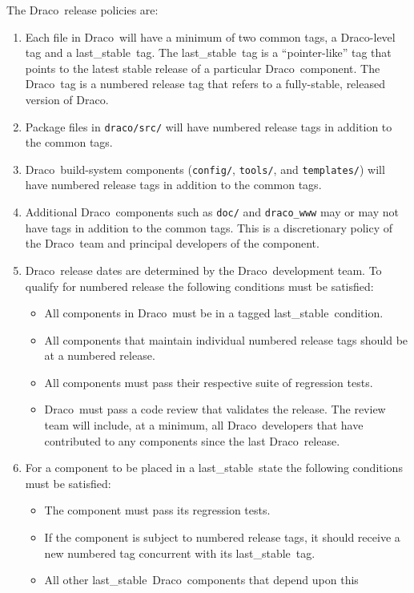 \documentclass[11pt]{nmemo}
\newcommand{\draco}{{\normalfont\normalsize\sffamily Draco}}
\newcommand{\stable}{{\normalfont\normalsize\ttfamily last\_stable}}
\begin{document}
The \draco\ release policies are:
\begin{enumerate}
\item Each file in \draco\ will have a minimum of two common tags, a
  \draco-level tag and a \stable\ tag.  The \stable\ tag is a
  ``pointer-like'' tag that points to the latest stable release of a
  particular \draco\ component.  The \draco\ tag is a numbered release
  tag that refers to a fully-stable, released version of \draco.
\item Package files in \texttt{draco/src/} will have numbered release
  tags in addition to the common tags.
\item \draco\ build-system components (\texttt{config/},
  \texttt{tools/}, and \texttt{templates/}) will have numbered release
  tags in addition to the common tags.
\item Additional \draco\ components such as \texttt{doc/} and
  \texttt{draco\_www} may or may not have tags in addition to the
  common tags.  This is a discretionary policy of the \draco\ team and 
  principal developers of the component.
\item \draco\ release dates are determined by the \draco\ development
  team.  To qualify for numbered release the following conditions must 
  be satisfied:
  \begin{itemize}
  \item All components in \draco\ must be in a tagged \stable\
    condition.
  \item All components that maintain individual numbered release tags
    should be at a numbered release.
  \item All components must pass their respective suite of
    regression tests.
  \item \draco\ must pass a code review that validates the release.
    The review team will include, at a minimum, all \draco\ developers
    that have contributed to any components since the last \draco\ 
    release.
  \end{itemize}
\item For a component to be placed in a \stable\ state the
  following conditions must be satisfied:
  \begin{itemize}
  \item The component must pass its regression tests.
  \item If the component is subject to numbered release tags, it
    should receive a new numbered tag concurrent with its \stable\ 
    tag. 
  \item All other \stable\ \draco\ components that depend upon this

\end{itemize}
\end{enumerate}
\end{document}
